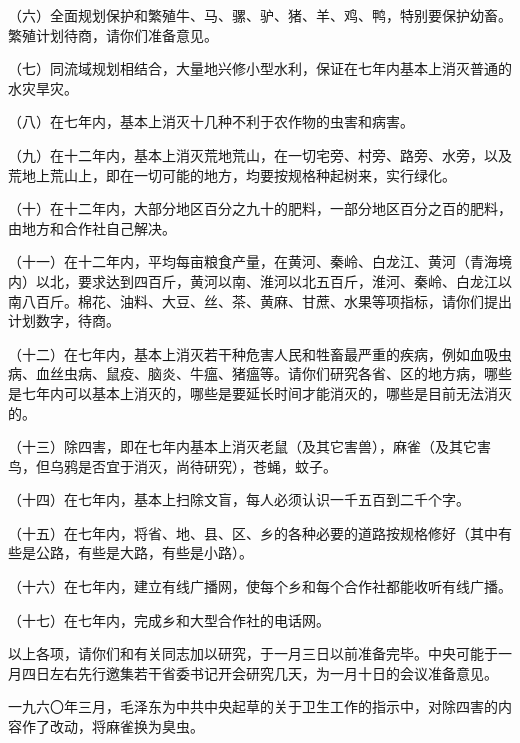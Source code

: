 （六）全面规划保护和繁殖牛、马、骡、驴、猪、羊、鸡、鸭，特别要保护幼畜。繁殖计划待商，请你们准备意见。

（七）同流域规划相结合，大量地兴修小型水利，保证在七年内基本上消灭普通的水灾旱灾。

（八）在七年内，基本上消灭十几种不利于农作物的虫害和病害。

（九）在十二年内，基本上消灭荒地荒山，在一切宅旁、村旁、路旁、水旁，以及荒地上荒山上，即在一切可能的地方，均要按规格种起树来，实行绿化。

（十）在十二年内，大部分地区百分之九十的肥料，一部分地区百分之百的肥料，由地方和合作社自己解决。

（十一）在十二年内，平均每亩粮食产量，在黄河、秦岭、白龙江、黄河（青海境内）以北，要求达到四百斤，黄河以南、淮河以北五百斤，淮河、秦岭、白龙江以南八百斤。棉花、油料、大豆、丝、茶、黄麻、甘蔗、水果等项指标，请你们提出计划数字，待商。

（十二）在七年内，基本上消灭若干种危害人民和牲畜最严重的疾病，例如血吸虫病、血丝虫病、鼠疫、脑炎、牛瘟、猪瘟等。请你们研究各省、区的地方病，哪些是七年内可以基本上消灭的，哪些是要延长时间才能消灭的，哪些是目前无法消灭的。

（十三）除四害，即在七年内基本上消灭老鼠（及其它害兽），麻雀（及其它害鸟，但乌鸦是否宜于消灭，尚待研究），苍蝇，蚊子。

（十四）在七年内，基本上扫除文盲，每人必须认识一千五百到二千个字。

（十五）在七年内，将省、地、县、区、乡的各种必要的道路按规格修好（其中有些是公路，有些是大路，有些是小路）。

（十六）在七年内，建立有线广播网，使每个乡和每个合作社都能收听有线广播。

（十七）在七年内，完成乡和大型合作社的电话网。

以上各项，请你们和有关同志加以研究，于一月三日以前准备完毕。中央可能于一月四日左右先行邀集若干省委书记开会研究几天，为一月十日的会议准备意见。


\begin{maonote}
一九六〇年三月，毛泽东为中共中央起草的关于卫生工作的指示中，对除四害的内容作了改动，将麻雀换为臭虫。
\end{maonote}
